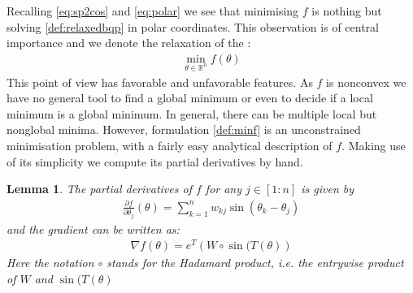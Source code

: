 \documentclass[12pt,a4paper]{article}
\theoremstyle{mythm}
\newtheorem{lem}[thm]{Lemma}
\begin{document}
Recalling \ref{eq:sp2cos} and \ref{eq:polar} we see that minimising $ f $ is nothing but solving \ref{def:relaxedbqp} in polar coordinates.
This observation is of central importance and we denote the relaxation of the \MCP:
\begin{align}
\label{def:minf}
\min_{\theta \in \mathbb{R} ^{ n } } f(\theta)
\end{align} 
This point of view has favorable and unfavorable features.
As $ f $ is nonconvex we have no general tool to find a global minimum or even to decide if a local minimum is a global minimum.
In general, there can be multiple local but nonglobal minima.
However, formulation \ref{def:minf} is an unconstrained minimisation problem, with a fairly easy analytical description of $ f $. 
Making use of its simplicity we compute its partial derivatives by hand.
\begin{lem}
The partial derivatives of $ f $ for any $ j \in \left[ 1 : n \right]  $ is given by
\begin{align*}
\frac{ \partial f }{ \partial \theta _{ j }  } (\theta) = \sum_{ k = 1 }^{ n } w _{ kj } \sin \left( \theta _{ k } - \theta _{ j }  \right) 
\end{align*} 
and the gradient can be written as:
\begin{align}
\label{eq:gradf} 
\nabla f(\theta) = e^T\left( W \circ \sin( T(\theta )  \right) 
\end{align} 
Here the notation $ \circ $ stands for the Hadamard product, i.e. the entrywise product of $ W $ and $ \sin( T (\theta )  $ 
\end{lem} 
\end{document}
